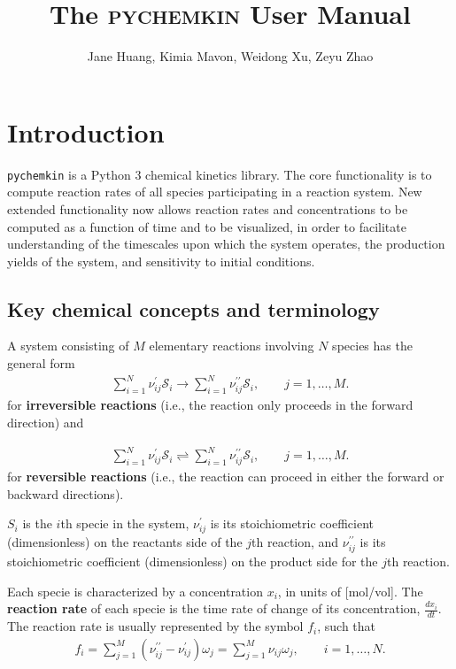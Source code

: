 \documentclass[12pt]{article}
\begin{document}
\title{The \textsc{pychemkin} User Manual}
\author{Jane Huang, Kimia Mavon, Weidong Xu, Zeyu Zhao}
\date{}
\maketitle
\section{Introduction}


{\tt pychemkin} is a Python 3 chemical kinetics library. The core functionality is to compute reaction rates of all species participating in a reaction system. New extended functionality now allows reaction rates and concentrations to be computed as a function of time and to be visualized, in order to facilitate understanding of the timescales upon which the system operates, the production yields of the system, and sensitivity to initial conditions. 

\subsection{Key chemical concepts and terminology}

A system consisting of $M$ elementary reactions involving $N$ species has the general form
\begin{align}
  \sum_{i=1}^{N}{\nu_{ij}^{\prime}\mathcal{S}_{i}} \longrightarrow
  \sum_{i=1}^{N}{\nu_{ij}^{\prime\prime}\mathcal{S}_{i}}, \qquad j = 1, \ldots, M.
\end{align}
for \textbf{irreversible reactions} (i.e., the reaction only proceeds in the forward direction) and 

\begin{align}
  \sum_{i=1}^{N}{\nu_{ij}^{\prime}\mathcal{S}_{i}} \rightleftharpoons
  \sum_{i=1}^{N}{\nu_{ij}^{\prime\prime}\mathcal{S}_{i}}, \qquad j = 1, \ldots, M.
\end{align}
for \textbf{reversible reactions} (i.e., the reaction can proceed in either the forward or backward directions). 

$S_i$ is the $i$th specie in the system, $\nu_{ij}^{\prime}$ is its stoichiometric coefficient (dimensionless) on the reactants side of the $j$th reaction, and $\nu_{ij}^{\prime\prime}$ is its stoichiometric coefficient (dimensionless) on the product side for the $j$th reaction.

Each specie is characterized by a concentration $x_i$, in units of [mol/vol].
The \textbf{reaction rate} of each specie is the time rate of change of its concentration, $\frac{dx_i}{dt}$. The reaction rate is usually represented by the symbol $f_i$, such that
\begin{align}
  f_{i} = \sum_{j=1}^{M}{(\nu_{ij}^{\prime\prime}-\nu_{ij}^\prime)\omega_{j}}= \sum_{j=1}^{M}{\nu_{ij}\omega_{j}}, \qquad i = 1, \ldots, N.
\end{align}
\end{document}
